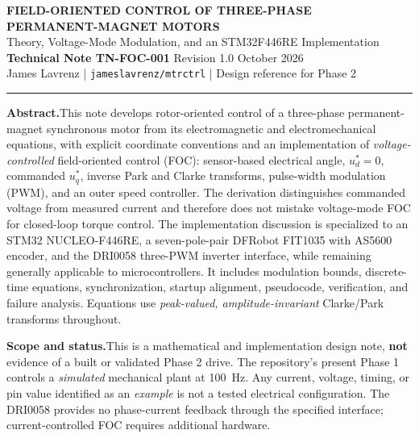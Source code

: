 \documentclass[10pt,letterpaper]{article}
\begin{document}
\begin{center}
{\Large\bfseries\color{navy} FIELD-ORIENTED CONTROL OF THREE-PHASE\\ PERMANENT-MAGNET MOTORS}\\[8pt]
{\large Theory, Voltage-Mode Modulation, and an STM32F446RE Implementation}\\[10pt]
{\normalsize \textbf{Technical Note TN-FOC-001} \quad Revision 1.0  October 2026}\\[4pt]
{\small James Lavrenz \quad | \quad \texttt{jameslavrenz/mtrctrl} \quad | \quad Design reference for Phase 2}
\end{center}
\vspace{5pt}\hrule\vspace{9pt}
\textbf{Abstract.}\quad This note develops rotor-oriented control of a three-phase permanent-magnet synchronous motor from its electromagnetic and electromechanical equations, with explicit coordinate conventions and an implementation of \emph{voltage-controlled} field-oriented control (FOC): sensor-based electrical angle, $u_d^*=0$, commanded $u_q^*$, inverse Park and Clarke transforms, pulse-width modulation (PWM), and an outer speed controller. The derivation distinguishes commanded voltage from measured current and therefore does not mistake voltage-mode FOC for closed-loop torque control. The implementation discussion is specialized to an STM32 NUCLEO-F446RE, a seven-pole-pair DFRobot FIT1035 with AS5600 encoder, and the DRI0058 three-PWM inverter interface, while remaining generally applicable to microcontrollers. It includes modulation bounds, discrete-time equations, synchronization, startup alignment, pseudocode, verification, and failure analysis. Equations use \emph{peak-valued, amplitude-invariant} Clarke/Park transforms throughout.

\textbf{Scope and status.}\quad This is a mathematical and implementation design note, \textbf{not} evidence of a built or validated Phase 2 drive. The repository's present Phase 1 controls a \emph{simulated} mechanical plant at \SI{100}{Hz}. Any current, voltage, timing, or pin value identified as an \emph{example} is not a tested electrical configuration. The DRI0058 provides no phase-current feedback through the specified interface; current-controlled FOC requires additional hardware.

\makeatletter
\renewcommand*\l@section{\@dottedtocline{1}{0em}{2.0em}}
\makeatother
{\small\tableofcontents}
\clearpage
\end{document}
